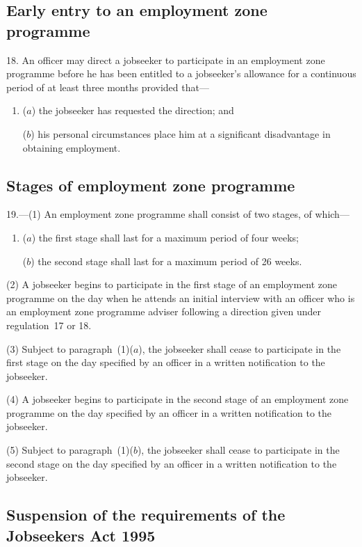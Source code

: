 \documentclass[12pt,a4paper]{article}
\begin{document}
\subsection[18. Early entry to an employment zone programme]{Early entry to an employment zone programme}

18.  An officer may direct a jobseeker to participate in an employment zone programme before he has been entitled to a jobseeker’s allowance for a continuous period of at least three months provided that—
\begin{enumerate}\item[]
($a$) the jobseeker has requested the direction; and

($b$) his personal circumstances place him at a significant disadvantage in obtaining employment.
\end{enumerate}

\subsection[19. Stages of employment zone programme]{Stages of employment zone programme}

19.---(1)  An employment zone programme shall consist of two stages, of which—
\begin{enumerate}\item[]
($a$) the first stage shall last for a maximum period of four weeks;

($b$) the second stage shall last for a maximum period of 26 weeks.
\end{enumerate}

(2) A jobseeker begins to participate in the first stage of an employment zone programme on the day when he attends an initial interview with an officer who is an employment zone programme adviser following a direction given under regulation~17 or 18.

(3) Subject to paragraph~(1)($a$), the jobseeker shall cease to participate in the first stage on the day specified by an officer in a written notification to the jobseeker.

(4) A jobseeker begins to participate in the second stage of an employment zone programme on the day specified by an officer in a written notification to the jobseeker.

(5) Subject to paragraph~(1)($b$), the jobseeker shall cease to participate in the second stage on the day specified by an officer in a written notification to the jobseeker.

\subsection[20. Suspension of the requirements of the Jobseekers Act 1995]{Suspension of the requirements of the Jobseekers Act 1995}
\end{document}
